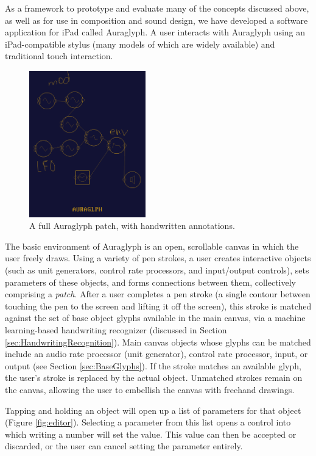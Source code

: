 \documentclass{nime-alternate}
\begin{document}
As a framework to prototype and evaluate many of the concepts discussed above, as well as for   use in composition and sound design, we have developed a software application for iPad called Auraglyph. 
A user interacts with Auraglyph using an iPad-compatible stylus (many models of which are widely available) and traditional touch interaction. 

\begin{figure}[h]
	\centering
		\includegraphics[width=0.45\textwidth]{figures/patch.png}
	\caption{A full Auraglyph patch, with handwritten annotations.}
	\label{fig:patch}
\end{figure}

The basic environment of Auraglyph is an open, scrollable canvas in which the user freely draws. 
Using a variety of pen strokes, a user creates interactive objects (such as unit generators, control rate processors, and input/output controls), sets parameters of these objects, and forms connections between them, collectively comprising a \emph{patch}. 
After a user completes a pen stroke (a single contour between touching the pen to the screen and lifting it off the screen), this stroke is matched against the set of base object glyphs available in the main canvas, via a machine learning-based handwriting recognizer (discussed in Section \ref{sec:HandwritingRecognition}). 
Main canvas objects whose glyphs can be matched include an audio rate processor (unit generator), control rate processor, input, or output (see Section \ref{sec:BaseGlyphs}). 
If the stroke matches an available glyph, the user's stroke is replaced by the actual object. 
Unmatched strokes remain on the canvas, allowing the user to embellish the canvas with freehand drawings. 

Tapping and holding an object will open up a list of parameters for that object (Figure \ref{fig:editor}). 
Selecting a parameter from this list opens a control into which writing a number will set the value. 
This value can then be accepted or discarded, or the user can cancel setting the parameter entirely. 
\end{document}
